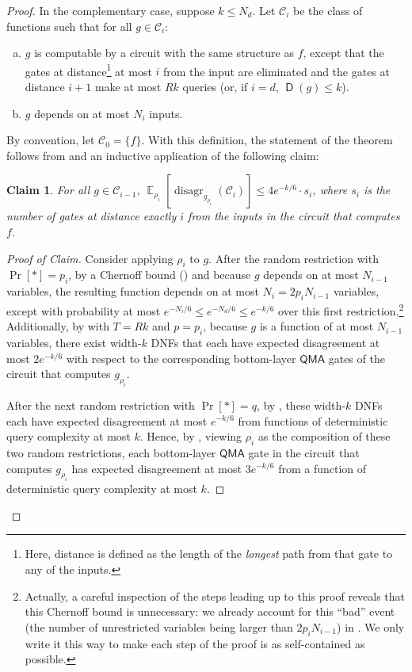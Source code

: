 \documentclass[11pt]{article}%
\newtheorem{claim}[theorem]{Claim}
\newcommand{\E}{\mathop{\mathbb{E}}}
\DeclareMathOperator{\disagr}{\mathrm{disagr}}
\DeclareMathOperator{\D}{\mathsf{D}}
\begin{document}
\begin{proof}
In the complementary case, suppose $k \le N_d$. Let $\mathcal{C}_i$ be the class of functions such that for all $g \in \mathcal{C}_i$:
\begin{enumerate}[(a)]
\item $g$ is computable by a circuit with the same structure as $f$, except that the gates at distance\footnote{Here, distance is defined as the length of the \textit{longest} path from that gate to any of the inputs.} at most $i$ from the input are eliminated and the gates at distance $i + 1$ make at most $Rk$ queries (or, if $i = d$, $\D(g) \le k$).
\item $g$ depends on at most $N_i$ inputs.
\end{enumerate}
By convention, let $\mathcal{C}_0 = \{f\}$. With this definition, the statement of the theorem follows from  and an inductive application of the following claim:
\begin{claim}
For all $g \in \mathcal{C}_{i-1}$, $\E_{\rho_i}\left[\disagr_{g_{\rho_i}}\left(\mathcal{C}_i\right)\right] \le 4e^{-k/6} \cdot s_i$, where $s_i$ is the number of gates at distance exactly $i$ from the inputs in the circuit that computes $f$.
\end{claim}
\begin{proof}[Proof of Claim]
Consider applying $\rho_i$ to $g$. After the random restriction with $\Pr[*] = p_i$, by a Chernoff bound () and because $g$ depends on at most $N_{i-1}$ variables, the resulting function depends on at most $N_i = 2p_iN_{i-1}$ variables, except with probability at most $e^{-N_i / 6} \le e^{-N_d / 6} \le e^{-k/6}$ over this first restriction.\footnote{Actually, a careful inspection of the steps leading up to this proof reveals that this Chernoff bound is unnecessary: we already account for this ``bad'' event (the number of unrestricted variables being larger than $2p_i N_{i-1}$) in . We only write it this way to make each step of the proof is as self-contained as possible.} Additionally, by  with $T = Rk$ and $p = p_i$, because $g$ is a function of at most $N_{i-1}$ variables, there exist width-$k$ DNFs that each have expected disagreement at most $2e^{-k/6}$ with respect to the corresponding bottom-layer $\mathsf{QMA}$ gates of the circuit that computes $g_{\rho_i}$.

After the next random restriction with $\Pr[*] = q$, by , these width-$k$ DNFs each have expected disagreement at most $e^{-k/6}$ from functions of deterministic query complexity at most $k$. Hence, by , viewing $\rho_i$ as the composition of these two random restrictions, each bottom-layer $\mathsf{QMA}$ gate in the circuit that computes $g_{\rho_i}$ has expected disagreement at most $3e^{-k/6}$ from a function of deterministic query complexity at most $k$.


\end{proof}
\end{proof}
\end{document}
